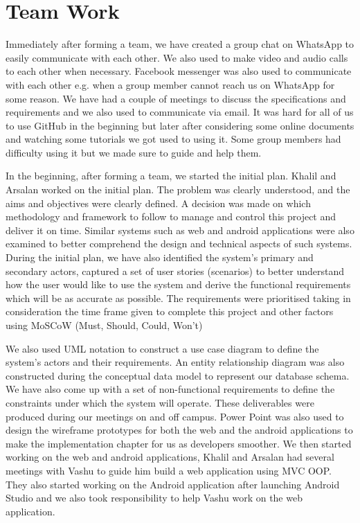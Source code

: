 \documentclass{article}
\begin{document}
\section{Team Work}
Immediately after forming a team, we have created a group chat on WhatsApp to easily communicate with each other. We also used to make video and audio calls to each other when necessary. Facebook messenger was also used to communicate with each other e.g. when a group member cannot reach us on WhatsApp for some reason. We have had a couple of meetings to discuss the specifications and requirements and we also used to communicate via email. It was hard for all of us to use GitHub in the beginning but later after considering some online documents and watching some tutorials we got used to using it. Some group members had difficulty using it but we made sure to guide and help them. \par 
In the beginning, after forming a team, we started the initial plan. Khalil and Arsalan worked on the initial plan. The problem was clearly understood, and the aims and objectives were clearly defined. A decision was made on which methodology and framework to follow to manage and control this project and deliver it on time. Similar systems such as web and android applications were also examined to better comprehend the design and technical aspects of such systems. During the initial plan, we have also identified the system’s primary and secondary actors, captured a set of user stories (scenarios) to better understand how the user would like to use the system and derive the functional requirements which will be as accurate as possible. The requirements were prioritised taking in consideration the time frame given to complete this project and other factors using MoSCoW (Must, Should, Could, Won’t) \par
We also used UML notation to construct a use case diagram to define the system’s actors and their requirements. An entity relationship diagram was also constructed during the conceptual data model to represent our database schema. We have also come up with a set of non-functional requirements to define the constraints under which the system will operate. These deliverables were produced during our meetings on and off campus. Power Point was also used to design the wireframe prototypes for both the web and the android applications to make the implementation chapter for us as developers smoother. We then started working on the web and android applications, Khalil and Arsalan had several meetings with Vashu to guide him build a web application using MVC OOP. They also started working on the Android application after launching Android Studio and we also took responsibility to help Vashu work on the web application. \par
\end{document}
